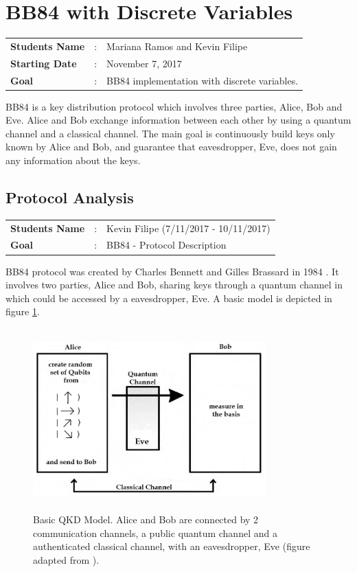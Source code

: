\clearpage
\section{BB84 with Discrete Variables}

\begin{tcolorbox}	
\begin{tabular}{p{2.75cm} p{0.2cm} p{10.5cm}} 	
\textbf{Students Name}  &:& Mariana Ramos and Kevin Filipe\\
\textbf{Starting Date} &:& November 7, 2017\\
\textbf{Goal}          &:& BB84 implementation with discrete variables.
\end{tabular}
\end{tcolorbox}

BB84 is a key distribution protocol which involves three parties, Alice, Bob and Eve. Alice and Bob exchange information between each other by using a quantum channel and a classical channel. The main goal is continuously build keys only known by Alice and Bob, and guarantee that eavesdropper, Eve, does not gain any information about the keys.


\subsection{Protocol Analysis}
\begin{tcolorbox}	
	\begin{tabular}{p{2.75cm} p{0.2cm} p{10.5cm}} 	
		\textbf{Students Name}  &:& Kevin Filipe (7/11/2017 - 10/11/2017)\\
		\textbf{Goal}          &:& BB84 - Protocol Description
	\end{tabular}
\end{tcolorbox}

BB84 protocol was created by Charles Bennett and Gilles Brassard in 1984 \cite{BB84}. It involves two parties, Alice and Bob, sharing keys through a quantum channel in which could be accessed by a eavesdropper, Eve. A basic model is depicted in figure \ref{fig:qkd model}.

\begin{figure}[H]
	\centering
	\includegraphics[width=0.8\textwidth,height=7cm]{./sdf/bb84_with_discrete_variables/figures/QKD_Model.png}
	\caption{Basic QKD Model. Alice and Bob are connected by 2 communication channels, a public quantum channel and a authenticated classical channel, with an eavesdropper, Eve (figure adapted from \cite{iqo}).}\label{fig:qkd model}
\end{figure}


